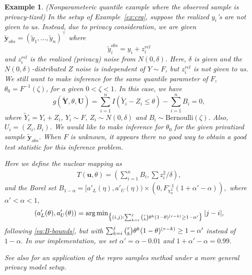 \documentclass[12pt]{article}
\theoremstyle{shortspace}
\newtheorem{example}{\quad Example}
\def\*#1{\bm{#1}}
\begin{document}
\begin{example} \label{ex:quantile_privacy}
(Nonparameteric quantile example where the observed sample is privacy-tized) In the setup of Example~\ref{ex:crq}, suppose the realized $y_i$'s are not given to us. Instead, due to privacy consideration, we are given 
$
\widetilde {\*y}_{obs} = (\widetilde y_1, \ldots, \widetilde y_n)^\top
$
where 
$$
\widetilde y_i^{obs} = y_i + z_i^{rel}
$$
and $z_i^{rel}$ is the realized (privacy) noise from $N(0, \delta)$. Here, $\delta$ is given and the $N(0, \delta)$-distributed $Z$ noise is independent of $Y \sim F$, but $z_i^{rel}$ is not given to us. We still want to make inference for the same quantile parameter of $F$, $\theta_0 = F^{-1}(\zeta)$, for a given $0<\zeta <1$. In this case, we have 
$$
g(\widetilde{\*Y}, \theta, \*U) = \sum_{i = 1}^n I(\widetilde Y_i - Z_i \leq \theta) - \sum_{i =1}^n B_i = 0,
$$ 
where $\widetilde Y_i = Y_i + Z_i$, $Y_i \sim F$, $Z_i \sim N(0,\delta)$ and $B_i \sim \text{Bernoulli}(\zeta)$. Also, $U_i = (Z_i, B_i)$. We would like to make inference for $\theta_0$ for the given privatized sample $\widetilde {\*y}_{obs}$. When $F$ is unknown, it appears there no good way to obtain a good test statistic for this inference problem. 


Here we define the nuclear mapping as 
\begin{align*}
     T(\*u, \theta)  = \left(\sum_{i=1}^n B_i, \sum z_i^2/\delta  \right),
\end{align*}
and the Borel set $B_{1 -\alpha} = [a'_L(\eta), a'_U(\eta)) \times (0, F^{-1}_{\chi^2_n}(1+\alpha'-\alpha)),$ where $\alpha' < \alpha <1,$
\begin{equation}
\left(a'_L(\theta), a'_U(\theta)\right) = 
\arg\min\nolimits_{\big\{(i,j): \sum^j_{k=i} {r \atopwithdelims( ) k} \theta^k (1 -  \theta)^{(r-k)} \geq 1- \alpha' \big\}}
    |j-i|, \nonumber
\end{equation}
following \eqref{eq:B-bounds}, but with $\sum^j_{k=i} {r \atopwithdelims( ) k} \theta^k (1 -  \theta)^{(r-k)} \geq 1-\alpha'$ instead of $1 - \alpha.$ In our implementation, we set $\alpha' = \alpha - 0.01$ and $1+\alpha' - \alpha = 0.99.$

See also \cite{Awan03072025} for an application of the repro samples method under a more general privacy model setup. 





\end{example}
\end{document}
